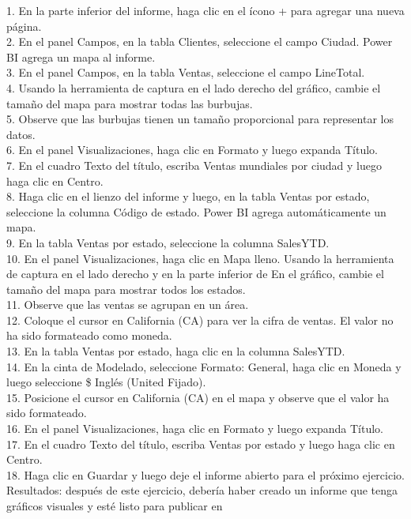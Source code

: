 \begin{flushleft}
\begin{itemize}
1. En la parte inferior del informe, haga clic en el ícono + para agregar una nueva página.\\
2. En el panel Campos, en la tabla Clientes, seleccione el campo Ciudad. Power BI agrega un mapa al informe.\\
3. En el panel Campos, en la tabla Ventas, seleccione el campo LineTotal.\\
4. Usando la herramienta de captura en el lado derecho del gráfico, cambie el tamaño del mapa para mostrar todas las burbujas.\\
5. Observe que las burbujas tienen un tamaño proporcional para representar los datos.\\
6. En el panel Visualizaciones, haga clic en Formato y luego expanda Título.\\
7. En el cuadro Texto del título, escriba Ventas mundiales por ciudad y luego haga clic en Centro.\\
8. Haga clic en el lienzo del informe y luego, en la tabla Ventas por estado, seleccione la columna Código de estado. Power BI
agrega automáticamente un mapa.\\
9. En la tabla Ventas por estado, seleccione la columna SalesYTD.\\
10. En el panel Visualizaciones, haga clic en Mapa lleno. Usando la herramienta de captura en el lado derecho y en la parte inferior de
En el gráfico, cambie el tamaño del mapa para mostrar todos los estados.\\
11. Observe que las ventas se agrupan en un área.\\
12. Coloque el cursor en California (CA) para ver la cifra de ventas. El valor no ha sido formateado como moneda.\\
13. En la tabla Ventas por estado, haga clic en la columna SalesYTD.\\
14. En la cinta de Modelado, seleccione Formato: General, haga clic en Moneda y luego seleccione \$ Inglés (United
Fijado).\\
15. Posicione el cursor en California (CA) en el mapa y observe que el valor ha sido formateado.\\
16. En el panel Visualizaciones, haga clic en Formato y luego expanda Título.\\
17. En el cuadro Texto del título, escriba Ventas por estado y luego haga clic en Centro.\\
18. Haga clic en Guardar y luego deje el informe abierto para el próximo ejercicio.\\
Resultados: después de este ejercicio, debería haber creado un informe que tenga gráficos visuales y esté listo para publicar en

\end{itemize}
\end{flushleft}
